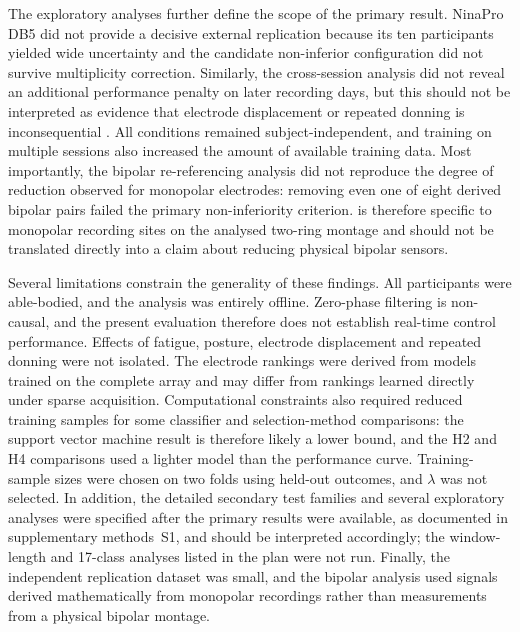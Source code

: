 The exploratory analyses further define the scope of the primary result. NinaPro DB5 did not provide a decisive external replication because its ten participants yielded wide uncertainty and the candidate non-inferior configuration did not survive multiplicity correction. Similarly, the cross-session analysis did not reveal an additional performance penalty on later recording days, but this should not be interpreted as evidence that electrode displacement or repeated donning is inconsequential \citep{hargrove2006effect,kaufmann2010fluctuating,vidovic2016improving}. All conditions remained subject-independent, and training on multiple sessions also increased the amount of available training data. Most importantly, the bipolar re-referencing analysis did not reproduce the degree of reduction observed for monopolar electrodes: removing even one of eight derived bipolar pairs failed the primary non-inferiority criterion.  is therefore specific to monopolar recording sites on the analysed two-ring montage and should not be translated directly into a claim about reducing physical bipolar sensors.

Several limitations constrain the generality of these findings.  All participants were able-bodied, and the analysis was entirely offline. Zero-phase filtering is non-causal, and the present evaluation therefore does not establish real-time control performance. Effects of fatigue, posture, electrode displacement and repeated donning were not isolated. The electrode rankings were derived from models trained on the complete array and may differ from rankings learned directly under sparse acquisition. Computational constraints also required reduced training samples for some classifier and selection-method comparisons: the support vector machine result is therefore likely a lower bound, and the H2 and H4 comparisons used a lighter model than the performance curve. Training-sample sizes were chosen on two folds using held-out outcomes, and $\lambda$ was not selected. In addition, the detailed secondary test families and several exploratory analyses were specified after the primary results were available, as documented in supplementary methods~S1, and should be interpreted accordingly; the window-length and 17-class analyses listed in the plan were not run. Finally, the independent replication dataset was small, and the bipolar analysis used signals derived mathematically from monopolar recordings rather than measurements from a physical bipolar montage.

